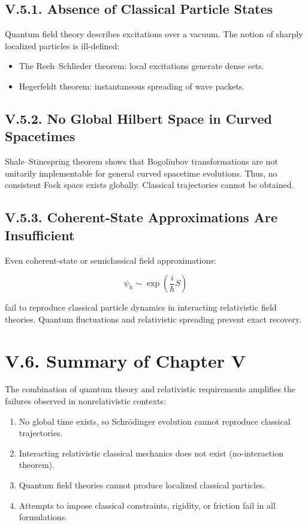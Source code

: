 \documentclass[12pt,oneside]{book}
\theoremstyle{plain}
\theoremstyle{definition}
\begin{document}
\subsection*{V.5.1. Absence of Classical Particle States}

Quantum field theory describes excitations over a vacuum. The notion of sharply localized particles is ill-defined:

\begin{itemize}
    \item The Reeh–Schlieder theorem: local excitations generate dense sets.
    \item Hegerfeldt theorem: instantaneous spreading of wave packets.
\end{itemize}

\subsection*{V.5.2. No Global Hilbert Space in Curved Spacetimes}

Shale–Stinespring theorem shows that Bogoliubov transformations are not unitarily implementable for general curved spacetime evolutions. Thus, no consistent Fock space exists globally. Classical trajectories cannot be obtained.

\subsection*{V.5.3. Coherent-State Approximations Are Insufficient}

Even coherent-state or semiclassical field approximations:

\[
\psi_\hbar \sim \exp\left(\frac{i}{\hbar} S\right)
\]

fail to reproduce classical particle dynamics in interacting relativistic field theories. Quantum fluctuations and relativistic spreading prevent exact recovery.

\section{V.6. Summary of Chapter V}

The combination of quantum theory and relativistic requirements amplifies the failures observed in nonrelativistic contexts:

\begin{enumerate}
    \item No global time exists, so Schrödinger evolution cannot reproduce classical trajectories.
    \item Interacting relativistic classical mechanics does not exist (no-interaction theorem).
    \item Quantum field theories cannot produce localized classical particles.
    \item Attempts to impose classical constraints, rigidity, or friction fail in all formulations.
\end{enumerate}
\end{document}
